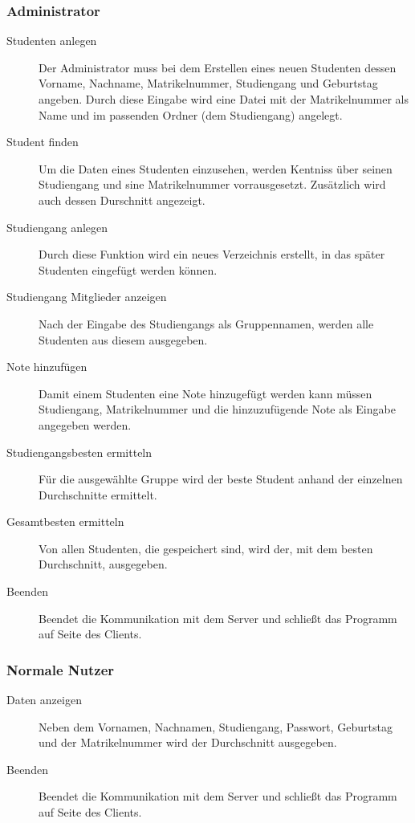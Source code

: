 \documentclass{scrartcl}
\begin{document}
		\subsubsection{Administrator}
			\begin{description}
				\item[Studenten anlegen] Der Administrator muss bei dem Erstellen eines neuen Studenten dessen Vorname, Nachname, Matrikelnummer, Studiengang und Geburtstag angeben. Durch diese Eingabe wird eine Datei mit der Matrikelnummer als Name und im passenden Ordner (dem Studiengang) angelegt.
				\item[Student finden] Um die Daten eines Studenten einzusehen, werden Kentniss über seinen Studiengang und sine Matrikelnummer vorrausgesetzt. Zusätzlich wird auch dessen Durschnitt angezeigt.
				\item[Studiengang anlegen] Durch diese Funktion wird ein neues Verzeichnis erstellt, in das später Studenten eingefügt werden können.
				\item[Studiengang Mitglieder anzeigen] Nach der Eingabe des Studiengangs als Gruppennamen, werden alle Studenten aus diesem ausgegeben.
				\item[Note hinzufügen] Damit einem Studenten eine Note hinzugefügt werden kann müssen Studiengang, Matrikelnummer und die hinzuzufügende Note als Eingabe angegeben werden.
				\item[Studiengangsbesten ermitteln] Für die ausgewählte Gruppe wird der beste Student anhand der einzelnen Durchschnitte ermittelt.
				\item[Gesamtbesten ermitteln] Von allen Studenten, die gespeichert sind, wird der, mit dem besten Durchschnitt, ausgegeben.
				\item[Beenden] Beendet die Kommunikation mit dem Server und schließt das Programm auf Seite des Clients.
			\end{description}
			\subsubsection{Normale Nutzer}
			\begin{description}
				\item[Daten anzeigen] Neben dem  Vornamen, Nachnamen, Studiengang, Passwort, Geburtstag und der Matrikelnummer wird der Durchschnitt ausgegeben.
				\item[Beenden] Beendet die Kommunikation mit dem Server und schließt das Programm auf Seite des Clients.
			\end{description}
\end{document}
